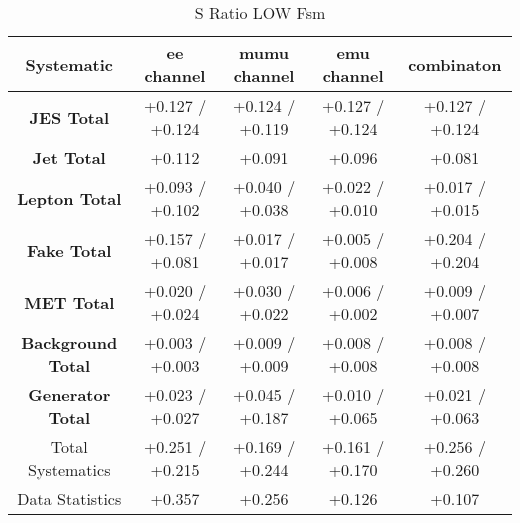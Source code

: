 \begin{table}[htbp]
\scriptsize
  \begin{center} 
  \begin{tabular}{|c|c|c|c|c|}
  \hline
     Systematic                            &  ee channel&  mumu channel&  emu channel&  combinaton\\
 \hline
\textbf{JES Total}                    &+0.127   / +0.124   & +0.124   / +0.119   & +0.127   / +0.124   & +0.127   / +0.124  \\
\textbf{Jet Total}                    &+0.112              & +0.091              & +0.096              & +0.081             \\
\textbf{Lepton Total}                 &+0.093   / +0.102   & +0.040   / +0.038   & +0.022   / +0.010   & +0.017   / +0.015  \\
\textbf{Fake Total}                   &+0.157   / +0.081   & +0.017   / +0.017   & +0.005   / +0.008   & +0.204   / +0.204  \\
\textbf{MET Total}                    &+0.020   / +0.024   & +0.030   / +0.022   & +0.006   / +0.002   & +0.009   / +0.007  \\
\textbf{Background Total}             &+0.003   / +0.003   & +0.009   / +0.009   & +0.008   / +0.008   & +0.008   / +0.008  \\
\textbf{Generator Total}              &+0.023   / +0.027   & +0.045   / +0.187   & +0.010   / +0.065   & +0.021   / +0.063  \\
  \hline
  \hline
Total Systematics                     &+0.251   / +0.215   & +0.169   / +0.244   & +0.161   / +0.170   & +0.256   / +0.260  \\
Data Statistics                       &+0.357              & +0.256              & +0.126              & +0.107             \\
  \hline
  \end{tabular}
  \end{center} 
  \label{tab:fsm_nominal_sratio_low}
  \caption{S Ratio LOW Fsm}
\end{table}

